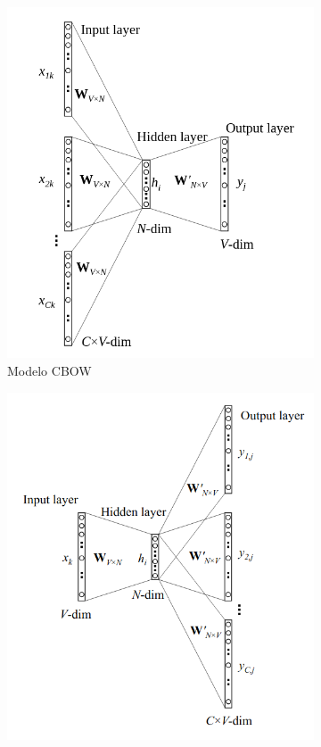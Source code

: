 \begin{figure}[h!]
    \centering
    \begin{subfigure}[b]{0.47\textwidth}
        \includegraphics[width=1.0\textwidth]{imagenes/cbow_esquema2.png}
        \caption{Modelo CBOW}
    \end{subfigure}
    \begin{subfigure}[b]{0.47\textwidth}
        \includegraphics[width=1.0\textwidth]{imagenes/skipgram_esquema.png}

\end{subfigure}
\end{figure}

